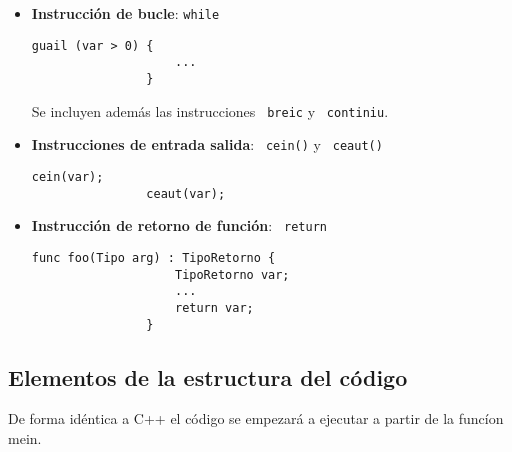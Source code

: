 \documentclass[10pt,a4paper]{article}
\begin{document}
\begin{itemize}
    \item \textbf{Instrucción de bucle}: \texttt{while}
    \begin{center}
        \begin{minipage}{\linewidth}
            \begin{lstlisting}[linewidth=0.3\linewidth, gobble=16]
                guail (var > 0) {
                    ...
                }
            \end{lstlisting}
        \end{minipage}
    \end{center}
    Se incluyen además las instrucciones \texttt{\color{blue} breic} y \texttt{\color{blue} continiu}.

    \item \textbf{Instrucciones de entrada salida}: \texttt{\color{blue} cein()} y \texttt{\color{blue} ceaut()}
    \begin{center}
        \begin{minipage}{\linewidth}
            \begin{lstlisting}[linewidth=0.3\linewidth, gobble=16]
                cein(var);
                ceaut(var);
            \end{lstlisting}
        \end{minipage}
    \end{center}
    
    \item \textbf{Instrucción de retorno de función}: \texttt{\color{blue} return}
    \begin{center}
        \begin{minipage}{\linewidth}
            \begin{lstlisting}[linewidth=0.5\linewidth, gobble=16]
                func foo(Tipo arg) : TipoRetorno {
                    TipoRetorno var;
                    ...
                    return var;
                }
            \end{lstlisting}
        \end{minipage}
    \end{center}

\end{itemize}

\subsection{Elementos de la estructura del código}
De forma idéntica a C++ el código se empezará a ejecutar a partir de la funcíon mein.
\end{document}
